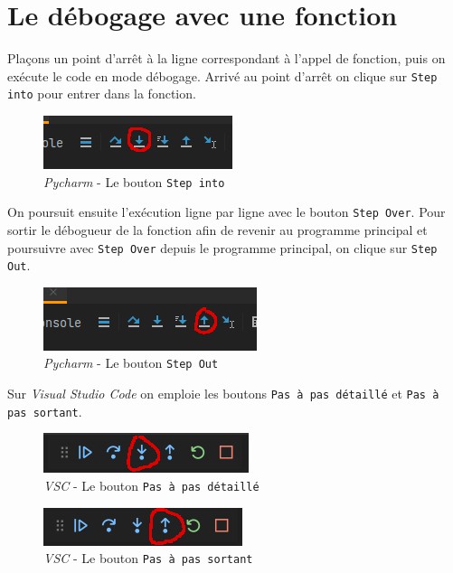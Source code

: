 \documentclass[a4paper,11pt]{book}
\begin{document}
\section{Le débogage avec une fonction}
Plaçons un point d'arrêt à la ligne correspondant à l'appel de fonction, puis on exécute le code en mode débogage. Arrivé au point d'arrêt on clique sur \texttt{Step into} pour entrer dans la fonction.
\begin{figure}[h]
\begin{center}
\includegraphics[scale=0.6]{IMG/Pycharm-09.png}
\caption{\textit{Pycharm} - Le bouton \texttt{Step into}}
\end{center}
\end{figure}
\medskip

On poursuit ensuite l'exécution ligne par ligne avec le bouton \texttt{Step Over}. Pour sortir le débogueur de la fonction afin de revenir au programme principal et poursuivre avec \texttt{Step Over} depuis le programme principal, on clique sur \texttt{Step Out}.
\begin{figure}[h]
\begin{center}
\includegraphics[scale=0.6]{IMG/Pycharm-10.png}
\caption{\textit{Pycharm} - Le bouton \texttt{Step Out}}
\end{center}
\end{figure}
\medskip

Sur \textit{Visual Studio Code} on emploie les boutons \texttt{Pas à pas détaillé} et \texttt{Pas à pas sortant}.
\begin{figure}[h]
\begin{center}
\includegraphics[scale=0.6]{IMG/VSC-04.png}
\caption{\textit{VSC} - Le bouton \texttt{Pas à pas détaillé}}
\end{center}
\end{figure}

\begin{figure}[h]
\begin{center}
\includegraphics[scale=0.6]{IMG/VSC-05.png}
\caption{\textit{VSC} - Le bouton \texttt{Pas à pas sortant}}
\end{center}
\end{figure}
\medskip
\end{document}
